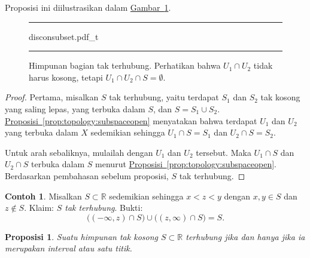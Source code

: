 \documentclass[12pt,openany]{book}
\newcommand{\R}{{\mathbb{R}}}
\theoremstyle{plain}
\newtheorem{prop}[thm]{Proposisi}
\theoremstyle{remark}
\theoremstyle{definition}
\newenvironment{myfig}{%
\begin{figure}[h!t]
\noindent\rule{\textwidth}{0.5pt}\vspace{12pt}\par\centering}%
{\par\noindent\rule{\textwidth}{0.5pt}
\end{figure}}
\theoremstyle{exercise}
\theoremstyle{example}
\newtheorem{example}[thm]{Contoh}
\newcommand{\figureref}[1]{\hyperref[#1]{Gambar~\ref*{#1}}}
\newcommand{\propref}[1]{\hyperref[#1]{Proposisi~\ref*{#1}}}
\begin{document}
Proposisi ini diilustrasikan dalam \figureref{fig:disconsubset}.

\begin{myfig}
{disconsubset.pdf_t}
\caption{Himpunan bagian tak terhubung. Perhatikan bahwa $U_1 \cap U_2$ tidak harus
kosong, tetapi $U_1 \cap U_2 \cap S = \emptyset$.\label{fig:disconsubset}}
\end{myfig}


\begin{proof}
Pertama, misalkan $S$ tak terhubung, yaitu terdapat
$S_1$ dan $S_2$ tak kosong yang saling lepas, yang
terbuka dalam $S$, dan $S = S_1 \cup S_2$.
\propref{prop:topology:subspaceopen} menyatakan bahwa terdapat $U_1$ dan $U_2$
yang terbuka dalam $X$ sedemikian sehingga $U_1 \cap S = S_1$ dan
$U_2 \cap S = S_2$.

Untuk arah sebaliknya, mulailah dengan $U_1$ dan $U_2$ tersebut.
Maka $U_1 \cap S$ dan $U_2 \cap S$ terbuka dalam $S$ menurut
\propref{prop:topology:subspaceopen}.
Berdasarkan pembahasan sebelum proposisi, $S$ tak terhubung.
\end{proof}

\begin{example}\label{example:disconnectedsetinR}
Misalkan $S \subset \R$ sedemikian sehingga $x < z < y$ dengan $x,y \in S$
dan $z \notin S$. Klaim: \emph{$S$ tak terhubung}. Bukti:
\begin{equation*}
\bigl( (-\infty,z) \cap S \bigr)
\cup
\bigl( (z,\infty) \cap S \bigr)
= S .
\end{equation*}
\end{example}

\begin{prop}
Suatu himpunan tak kosong $S \subset \R$ terhubung jika dan hanya jika ia merupakan
interval atau satu titik.
\end{prop}
\end{document}
